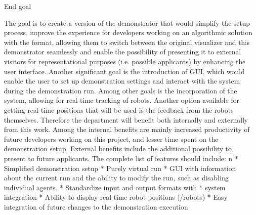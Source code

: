 \sec End goal

The goal is to create a version of the demonstrator that would simplify the setup process, improve the experience for developers working on an algorithmic solution with the {\mapfIR} format, allowing them to switch between the original visualizer and this demonstrator seamlessly and enable the possibility of presenting it to external visitors for representational purposes (i.e. possible applicants) by enhancing the user interface.\br
Another significant goal is the introduction of GUI, which would enable the user to set up demonstration settings and interact with the system during the demonstration run.
Among other goals is the incorporation of the {\vicon} system, allowing for real-time tracking of robots. Another option available for getting real-time positions that will be used is the feedback from the robots themselves.\br
\br
Therefore the department will benefit both internally and externally from this work. Among the internal benefits are mainly increased productivity of future developers working on this project, and lesser time spent on the demonstration setup. External benefits include the additional possibility to present to future applicants.
The complete list of features should include:
\begitems \style n
    * Simplified demonstration setup
    * Purely virtual run
    * GUI with information about the current run and the ability to modify the run, such as disabling individual agents. 
    * Standardize input and output formats with \mapfIR
    * {\vicon} system integration
    * Ability to display real-time robot positions ({\vicon}/robots)
    * Easy integration of future changes to the demonstration execution
\enditems
